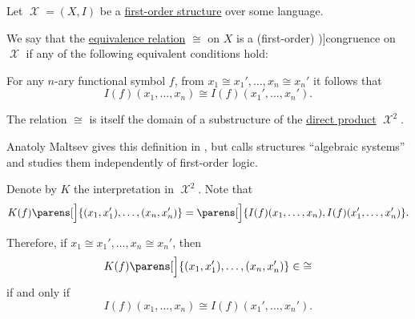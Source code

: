 \begin{definition}\label{def:first_order_congruence}
  Let \( \mscrX = (X, I) \) be a \hyperref[def:first_order_structure]{first-order structure} over some language.

  We say that the \hyperref[def:equivalence_relation]{equivalence relation} \( \cong \) on \( X \) is a (first-order) \term[ru=конгруэнция (\cite[46]{Мальцев1970Системы})]{congruence} on \( \mscrX \) if any of the following equivalent conditions hold:
  \begin{thmenum}
     For any \( n \)-ary functional symbol \( f \), from \( x_1 \cong x_1', \ldots, x_n \cong x_n' \) it follows that
    \begin{equation}\label{eq:def:first_order_congruence/direct}
      I(f)(x_1, \ldots, x_n) \cong I(f)(x_1', \ldots, x_n').
    \end{equation}

     The relation \( \cong \) is itself the domain of a substructure of the \hyperref[def:first_order_direct_product]{direct product} \( \mscrX^2 \).
  \end{thmenum}
\end{definition}
\begin{comments}
  \item Anatoly Maltsev gives this definition in \cite[46]{Мальцев1970Системы}, but calls structures \enquote{algebraic systems} and studies them independently of first-order logic.
\end{comments}
\begin{defproof}
   Denote by \( K \) the interpretation in \( \mscrX^2 \). Note that
  \begin{equation*}
    K(f)\parens[\Big]{ (x_1, x_1'), \ldots, (x_n, x_n') }
    =
    \parens[\Big]{ I(f)(x_1, \ldots, x_n), I(f)(x_1', \ldots, x_n') }.
  \end{equation*}

  Therefore, if \( x_1 \cong x_1', \ldots, x_n \cong x_n' \), then
  \begin{equation*}
    K(f)\parens[\Big]{ (x_1, x_1'), \ldots, (x_n, x_n') } \in {\cong}
  \end{equation*}
  if and only if
  \begin{equation*}
    I(f)(x_1, \ldots, x_n) \cong I(f)(x_1', \ldots, x_n').
  \end{equation*}
\end{defproof}

